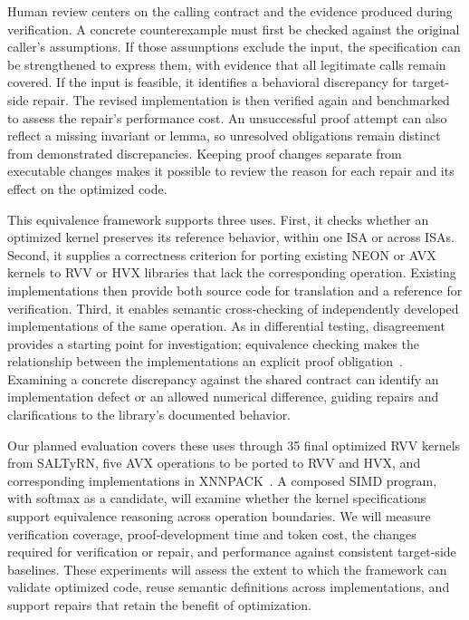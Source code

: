 Human review centers on the calling contract and the evidence produced during verification. A concrete counterexample must first be checked against the original caller's assumptions. If those assumptions exclude the input, the specification can be strengthened to express them, with evidence that all legitimate calls remain covered. If the input is feasible, it identifies a behavioral discrepancy for target-side repair. The revised implementation is then verified again and benchmarked to assess the repair's performance cost. An unsuccessful proof attempt can also reflect a missing invariant or lemma, so unresolved obligations remain distinct from demonstrated discrepancies. Keeping proof changes separate from executable changes makes it possible to review the reason for each repair and its effect on the optimized code.

This equivalence framework supports three uses. First, it checks whether an optimized kernel preserves its reference behavior, within one ISA or across ISAs. Second, it supplies a correctness criterion for porting existing NEON or AVX kernels to RVV or HVX libraries that lack the corresponding operation. Existing implementations then provide both source code for translation and a reference for verification. Third, it enables semantic cross-checking of independently developed implementations of the same operation. As in differential testing, disagreement provides a starting point for investigation; equivalence checking makes the relationship between the implementations an explicit proof obligation~\cite{mckeeman,symdiff}. Examining a concrete discrepancy against the shared contract can identify an implementation defect or an allowed numerical difference, guiding repairs and clarifications to the library's documented behavior.

Our planned evaluation covers these uses through 35 final optimized RVV kernels from SALTyRN, five AVX operations to be ported to RVV and HVX, and corresponding implementations in XNNPACK~\cite{final-kernels}. A composed SIMD program, with softmax as a candidate, will examine whether the kernel specifications support equivalence reasoning across operation boundaries. We will measure verification coverage, proof-development time and token cost, the changes required for verification or repair, and performance against consistent target-side baselines.  These experiments will assess the extent to which the framework can validate optimized code, reuse semantic definitions across implementations, and support repairs that retain the benefit of optimization.


